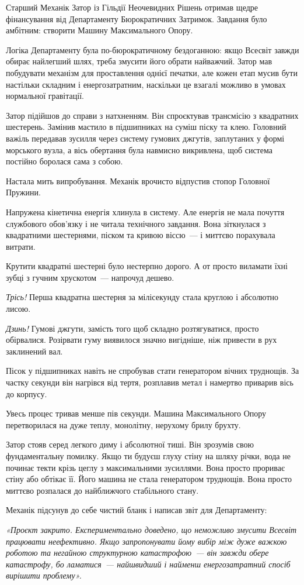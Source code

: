 \documentclass[12pt, a4paper, openany]{book}
\begin{document}
\begin{terrybox}
Старший Механік Затор із Гільдії Неочевидних Рішень отримав щедре фінансування від Департаменту Бюрократичних Затримок. Завдання було амбітним: створити Машину Максимального Опору.

Логіка Департаменту була по-бюрократичному бездоганною: якщо Всесвіт завжди обирає найлегший шлях, треба змусити його обрати найважчий. Затор мав побудувати механізм для проставлення однієї печатки, але кожен етап мусив бути настільки складним і енергозатратним, наскільки це взагалі можливо в умовах нормальної гравітації.

Затор підійшов до справи з натхненням. Він спроєктував трансмісію з квадратних шестерень. Замінив мастило в підшипниках на суміш піску та клею. Головний важіль передавав зусилля через систему гумових джгутів, заплутаних у формі морського вузла, а вісь обертання була навмисно викривлена, щоб система постійно боролася сама з собою.

Настала мить випробування. Механік врочисто відпустив стопор Головної Пружини.

Напружена кінетична енергія хлинула в систему. Але енергія не мала почуття службового обов'язку і не читала технічного завдання. Вона зіткнулася з квадратними шестернями, піском та кривою віссю~--- і миттєво порахувала витрати.

Крутити квадратні шестерні було нестерпно дорого. А от просто виламати їхні зубці з гучним хрускотом~--- напрочуд дешево.

\textit{Трісь!} Перша квадратна шестерня за мілісекунду стала круглою і абсолютно лисою.

\textit{Дзинь!} Гумові джгути, замість того щоб складно розтягуватися, просто обірвалися. Розірвати гуму виявилося значно вигідніше, ніж привести в рух заклинений вал.

Пісок у підшипниках навіть не спробував стати генератором вічних труднощів. За частку секунди він нагрівся від тертя, розплавив метал і намертво приварив вісь до корпусу.

Увесь процес тривав менше пів секунди. Машина Максимального Опору перетворилася на дуже теплу, монолітну, нерухому брилу брухту.

Затор стояв серед легкого диму і абсолютної тиші. Він зрозумів свою фундаментальну помилку. Якщо ти будуєш глуху стіну на шляху річки, вода не починає текти крізь цеглу з максимальними зусиллями. Вона просто прориває стіну або обтікає її. Його машина не стала генератором труднощів. Вона просто миттєво розпалася до найближчого стабільного стану.

Механік підсунув до себе чистий бланк і написав звіт для Департаменту:

\medskip
\textit{«Проєкт закрито. Експериментально доведено, що неможливо змусити Всесвіт працювати неефективно. Якщо запропонувати йому вибір між дуже важкою роботою та негайною структурною катастрофою~--- він завжди обере катастрофу, бо ламатися~--- найшвидший і найменш енергозатратний спосіб вирішити проблему».}
\end{terrybox}
\end{document}
